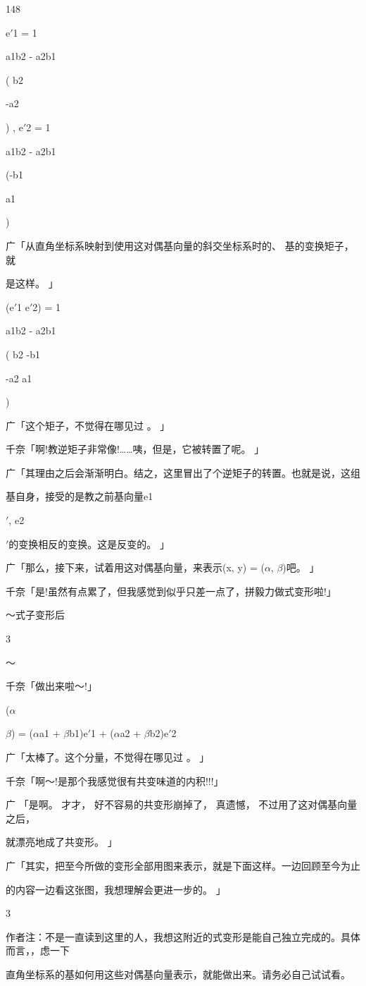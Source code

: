 148\par
e$\prime$1 = 1\par
a1b2 - a2b1\par
( b2\par
-a2\par
) , e$\prime$2 = 1\par
a1b2 - a2b1\par
(-b1\par
a1\par
)\par
广「从直角坐标系映射到使用这对偶基向量的斜交坐标系时的、 基的变换矩子，就\par
是这样。 」\par
(e$\prime$1 e$\prime$2) = 1\par
a1b2 - a2b1\par
( b2 -b1\par
-a2 a1\par
)\par
广「这个矩子，不觉得在哪见过 。 」\par
千奈「啊!教逆矩子非常像!……咦，但是，它被转置了呢。 」\par
广「其理由之后会渐渐明白。结之，这里冒出了个逆矩子的转置。也就是说，这组\par
基自身，接受的是教之前基向量e1\par
$\prime$, e2\par
$\prime$的变换相反的变换。这是反变的。 」\par
广「那么，接下来，试着用这对偶基向量，来表示(x, y) = ($\alpha$, $\beta$)吧。 」\par
千奈「是!虽然有点累了，但我感觉到似乎只差一点了，拼毅力做式变形啦!」\par
～式子变形后\par
3\par
～\par
千奈「做出来啦～!」\par
($\alpha$\par
$\beta$) = ($\alpha$a1 + $\beta$b1)e$\prime$1 + ($\alpha$a2 + $\beta$b2)e$\prime$2\par
广「太棒了。这个分量，不觉得在哪见过 。 」\par
千奈「啊～!是那个我感觉很有共变味道的内积!!!」\par
广 「是啊。 才才， 好不容易的共变形崩掉了， 真遗憾， 不过用了这对偶基向量之后，\par
就漂亮地成了共变形。 」\par
广「其实，把至今所做的变形全部用图来表示，就是下面这样。一边回顾至今为止\par
的内容一边看这张图，我想理解会更进一步的。 」\par
3\par
作者注：不是一直读到这里的人，我想这附近的式变形是能自己独立完成的。具体而言，，虑一下\par
直角坐标系的基如何用这些对偶基向量表示，就能做出来。请务必自己试试看。\par

